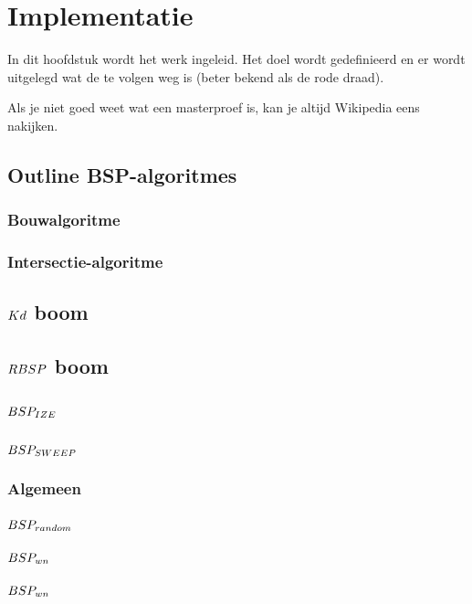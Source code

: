 \chapter{Implementatie}
\label{hoofdstuk:implementatie}
In dit hoofdstuk wordt het werk ingeleid. Het doel wordt gedefinieerd en er
wordt uitgelegd wat de te volgen weg is (beter bekend als de rode draad).

Als je niet goed weet wat een masterproef is, kan je altijd
Wikipedia eens nakijken.

\section{Outline BSP-algoritmes}
\subsection{Bouwalgoritme}
\subsection{Intersectie-algoritme}
\section{$Kd$ boom}
\section{$RBSP$ boom}
\section{$BSP_{IZE}$}
\section{$BSP_{SWEEP}$}
\subsection{Algemeen}
\subsection{$BSP_{random}$}
\subsection{$BSP_{wn}$}
\subsection{$BSP_{wn}$}


